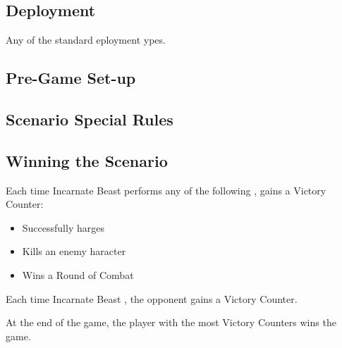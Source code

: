 
\label{DivineIntervention}


\subsection*{Deployment}

Any of the standard eployment ypes.

\subsection*{Pre-Game Set-up}


\subsection*{Scenario Special Rules}

\newcommand{\incarnatebeast}{Incarnate Beast}



\subsection*{Winning the Scenario}

Each time  Incarnate Beast performs any of the following ,  gains a Victory Counter:

\begin{itemize}
\item Successfully harges 
\item Kills an enemy haracter
\item Wins a Round of Combat
\end{itemize}

Each time  Incarnate Beast , the opponent  gains a Victory Counter.

At the end of the game, the player with the most Victory Counters wins the game.


